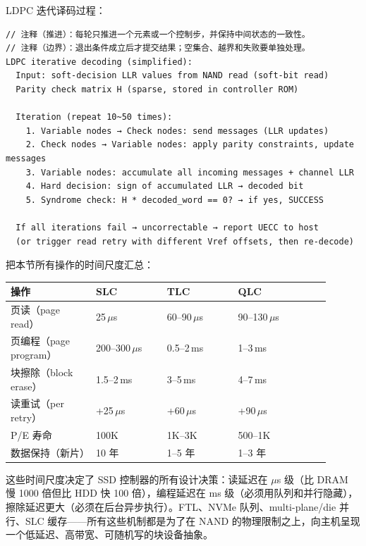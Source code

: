LDPC 迭代译码过程：

\begin{lstlisting}
// 注释（推进）：每轮只推进一个元素或一个控制步，并保持中间状态的一致性。
// 注释（边界）：退出条件成立后才提交结果；空集合、越界和失败要单独处理。
LDPC iterative decoding (simplified):
  Input: soft-decision LLR values from NAND read (soft-bit read)
  Parity check matrix H (sparse, stored in controller ROM)

  Iteration (repeat 10~50 times):
    1. Variable nodes → Check nodes: send messages (LLR updates)
    2. Check nodes → Variable nodes: apply parity constraints, update messages
    3. Variable nodes: accumulate all incoming messages + channel LLR
    4. Hard decision: sign of accumulated LLR → decoded bit
    5. Syndrome check: H * decoded_word == 0? → if yes, SUCCESS

  If all iterations fail → uncorrectable → report UECC to host
  (or trigger read retry with different Vref offsets, then re-decode)
\end{lstlisting}



把本节所有操作的时间尺度汇总：

\begin{longtable}{L{0.24\linewidth}L{0.2\linewidth}L{0.2\linewidth}L{0.26\linewidth}}
\toprule
操作 & SLC & TLC & QLC \\
\midrule
页读（page read） & 25\,$\mu$s & 60--90\,$\mu$s & 90--130\,$\mu$s \\\tablerowrule
页编程（page program） & 200--300\,$\mu$s & 0.5--2\,ms & 1--3\,ms \\\tablerowrule
块擦除（block erase） & 1.5--2\,ms & 3--5\,ms & 4--7\,ms \\\tablerowrule
读重试（per retry） & +25\,$\mu$s & +60\,$\mu$s & +90\,$\mu$s \\\tablerowrule
P/E 寿命 & 100K & 1K--3K & 500--1K \\\tablerowrule
数据保持（新片） & 10 年 & 1--5 年 & 1--3 年 \\
\bottomrule
\end{longtable}

这些时间尺度决定了 SSD 控制器的所有设计决策：读延迟在 $\mu$s 级（比 DRAM 慢 1000 倍但比 HDD 快 100 倍），编程延迟在 ms 级（必须用队列和并行隐藏），擦除延迟更大（必须在后台异步执行）。FTL、NVMe 队列、multi-plane/die 并行、SLC 缓存——所有这些机制都是为了在 NAND 的物理限制之上，向主机呈现一个低延迟、高带宽、可随机写的块设备抽象。

